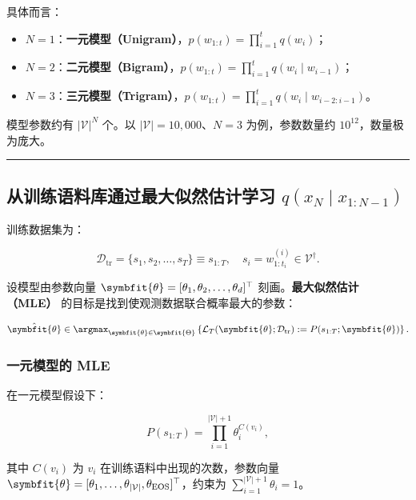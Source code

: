 \documentclass[
  11pt,
  a4paper,
]{article}
\providecommand{\tightlist}{%
  \setlength{\itemsep}{0pt}\setlength{\parskip}{0pt}}
\providecommand{\bm}[1]{\symbfit{#1}}
\begin{document}
具体而言：

\begin{itemize}
\tightlist
\item
  \(N = 1\)：\textbf{一元模型（Unigram）}，\(p(w_{1:t}) = \prod_{i=1}^t q(w_i)\)；
\item
  \(N = 2\)：\textbf{二元模型（Bigram）}，\(p(w_{1:t}) = \prod_{i=1}^t q(w_i \mid w_{i-1})\)；
\item
  \(N = 3\)：\textbf{三元模型（Trigram）}，\(p(w_{1:t}) = \prod_{i=1}^t q(w_i \mid w_{i-2:i-1})\)。
\end{itemize}

模型参数约有 \(|\mathcal{V}|^N\) 个。以
\(|\mathcal{V}| = 10{,}000\)、\(N = 3\) 为例，参数数量约
\(10^{12}\)，数量极为庞大。

\begin{center}\rule{0.5\linewidth}{0.5pt}\end{center}

\subsection{\texorpdfstring{从训练语料库通过最大似然估计学习
\(q(x_N \mid x_{1:N-1})\)}{从训练语料库通过最大似然估计学习 q(x\_N \textbackslash mid x\_\{1:N-1\})}}\label{ux4eceux8badux7ec3ux8bedux6599ux5e93ux901aux8fc7ux6700ux5927ux4f3cux7136ux4f30ux8ba1ux5b66ux4e60-qx_n-mid-x_1n-1}

训练数据集为：

\[\mathcal{D}_{\text{tr}} = \{s_1, s_2, \ldots, s_T\} \equiv s_{1:T}, \quad s_i = w_{1:t_i}^{(i)} \in \mathcal{V}^{\dagger}.\]

设模型由参数向量
\(\bm{\theta} = [\theta_1, \theta_2, \ldots, \theta_d]^\top\)
刻画。\textbf{最大似然估计（MLE）}
的目标是找到使观测数据联合概率最大的参数：

\[\hat{\bm{\theta}} \in \argmax_{\bm{\theta} \in \bm{\Theta}} \left\{ \mathcal{L}_T(\bm{\theta}; \mathcal{D}_{\text{tr}}) := P(s_{1:T}; \bm{\theta}) \right\}.\]

\subsubsection{一元模型的 MLE}\label{ux4e00ux5143ux6a21ux578bux7684-mle}

在一元模型假设下：

\[P(s_{1:T}) = \prod_{i=1}^{|\mathcal{V}|+1} \theta_i^{C(v_i)},\]

其中 \(C(v_i)\) 为 \(v_i\) 在训练语料中出现的次数，参数向量
\(\bm{\theta} = [\theta_1, \ldots, \theta_{|\mathcal{V}|}, \theta_{\text{EOS}}]^\top\)，约束为
\(\sum_{i=1}^{|\mathcal{V}|+1} \theta_i = 1\)。
\end{document}
